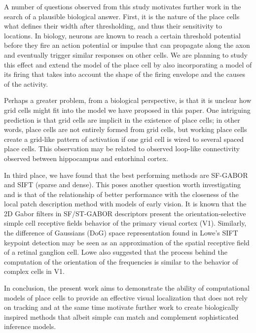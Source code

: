 A number of questions observed from this study motivates further work in the search of a plausible biological answer. First, it is the nature of the place cells what defines their width after thresholding, and thus their sensitivity to locations. In biology, neurons are known to reach a certain threshold potential before they fire an action potential or impulse that can propagate along the axon and eventually trigger similar responses on other cells. We are planning to study this effect and extend the model of the place cell by also incorporating a model of its firing that takes into account the shape of the firing envelope and the causes of the activity.


Perhaps a greater problem, from a biological perspective, is that it is unclear how grid cells might fit into the model we have proposed in this paper.  One intriguing prediction is that grid cells are implicit in the existence of place cells; in other words, place cells are not entirely formed from grid cells, but working place cells create a grid-like pattern of activation if one grid cell is wired to several spaced place cells.  This observation may be related to observed loop-like connectivity observed between hippocampus and entorhinal cortex. 

In third place, we have found that the best performing methods are SF-GABOR and SIFT (sparse and dense). This poses another question worth investigating and is that of the relationship of better performance with the closeness of the local patch description method with models of early vision. It is known that the 2D Gabor filters in SF/ST-GABOR descriptors present the orientation-selective simple cell receptive fields behavior of the primary visual cortex (V1). Similarly, the difference of Gaussians (DoG) space representation found in Lowe's SIFT keypoint detection may be seen as an approximation of the spatial receptive field of a retinal ganglion cell. Lowe also suggested that the process behind the computation of the orientation of the frequencies is similar to the behavior of complex cells in V1.


In conclusion, the present work aims to demonstrate the ability of computational models of place cells to provide an effective visual localization that does not rely on tracking and at the same time motivate further work to create biologically inspired methods that albeit simple can match and complement sophisticated inference models.


